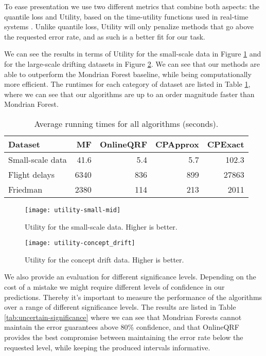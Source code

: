 To ease presentation we use two different metrics that
combine both aspects: the quantile loss \cite{koenker2005qr} and Utility,
based on the time-utility functions used in real-time systems \cite{tuf2005}.
Unlike quantile loss, Utility will only penalize methods that go above
the requested error rate, and as such is a better fit for our task.

We can see the results in terms of Utility for the small-scale data in Figure \ref{fig:utility-small-mid}
and for the large-scale drifting datasets in Figure \ref{fig:utility-concept-drift}.
We can see that our methods are able to outperform the Mondrian Forest baseline,
while being computationally more efficient. The runtimes for each
category of dataset are listed in Table \ref{tab:uncertain-runtimes}, where we
can see that our algorithms are up to an order magnitude faster
than Mondrian Forest.

\begin{table}
	\centering
	\begin{tabular}{l r r r r}
		\toprule
		Dataset      & MF  & OnlineQRF & CPApprox & CPExact  \\
		\midrule
		Small-scale data & 41.6       & 5.4     & 5.7      & 102.3        \\
		Flight delays   & 6340        & 836       & 899       & 27863        \\
		Friedman     & 2380      & 114      & 213      & 2011            \\
		\bottomrule
	\end{tabular}
	\caption{Average running times for all algorithms (seconds).}
	\label{tab:uncertain-runtimes}
\end{table}



\begin{figure}
	\centering
	\texttt{[image: utility-small-mid]}
	\caption{Utility for the small-scale data. Higher is better.}
	\label{fig:utility-small-mid}
\end{figure}

\begin{figure}
	\centering
	\texttt{[image: utility-concept\_drift]}
	\caption{Utility for the concept drift data. Higher is better.}
	\label{fig:utility-concept-drift}
\end{figure}

We also provide an evaluation for different significance levels.
Depending on the cost of a mistake we might require different levels of confidence
in our predictions. Thereby it's important to measure the performance of the 
algorithms over a range of different significance levels. The results are listed
in Table \ref{tab:uncertain-significance} where we can see that Mondrian Forests cannot maintain the
error guarantees above 80\% confidence, and that OnlineQRF provides the best
compromise between maintaining the error rate below the requested level, while
keeping the produced intervals informative.

